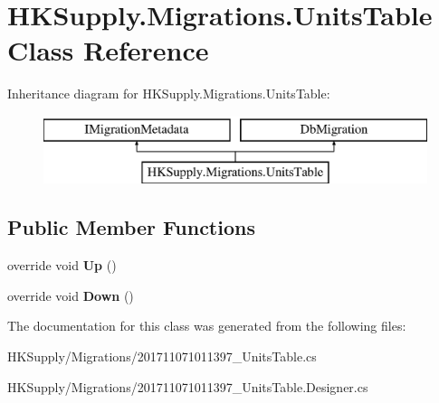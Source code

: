 \hypertarget{class_h_k_supply_1_1_migrations_1_1_units_table}{}\section{H\+K\+Supply.\+Migrations.\+Units\+Table Class Reference}
\label{class_h_k_supply_1_1_migrations_1_1_units_table}
Inheritance diagram for H\+K\+Supply.\+Migrations.\+Units\+Table\+:\begin{figure}[H]
\begin{center}
\leavevmode
\includegraphics[height=2.000000cm]{class_h_k_supply_1_1_migrations_1_1_units_table}
\end{center}
\end{figure}
\subsection*{Public Member Functions}
\begin{DoxyCompactItemize}
\item 
\mbox{\label{class_h_k_supply_1_1_migrations_1_1_units_table_a918930cbb729a3f251e40a2178aa035e}} 
override void {\bfseries Up} ()
\item 
\mbox{\label{class_h_k_supply_1_1_migrations_1_1_units_table_a6e38cdb1cad39d5af2cbf86de32c3341}} 
override void {\bfseries Down} ()
\end{DoxyCompactItemize}


The documentation for this class was generated from the following files\+:\begin{DoxyCompactItemize}
\item 
H\+K\+Supply/\+Migrations/201711071011397\+\_\+\+Units\+Table.\+cs\item 
H\+K\+Supply/\+Migrations/201711071011397\+\_\+\+Units\+Table.\+Designer.\+cs\end{DoxyCompactItemize}

